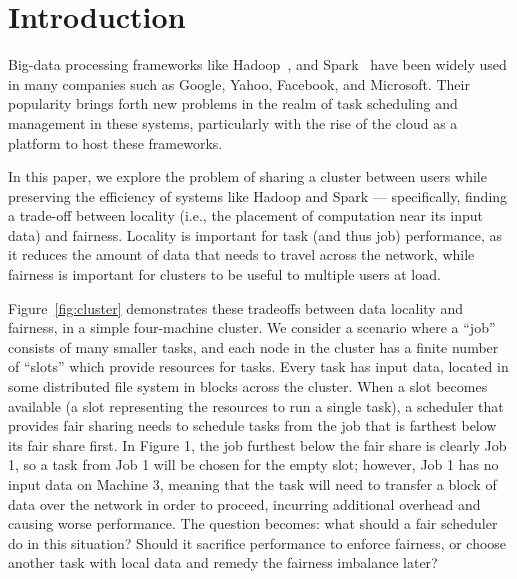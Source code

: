 \section{Introduction}\label{sec:intro}
Big-data processing frameworks like Hadoop~\cite{Shvachko:2010}, and Spark~\cite{Zaharia2012} have been widely 
used in many companies such as Google, Yahoo, Facebook, and Microsoft. Their popularity 
brings forth new problems in the realm of task scheduling and management in these systems,
particularly with the rise of the cloud as a platform to host these frameworks.

In this paper, we explore the problem of sharing a cluster between users while preserving 
the efficiency of systems like Hadoop and Spark --- specifically, finding a trade-off 
between locality (i.e., the placement of computation near its input data) and fairness. 
Locality is important for task (and thus job) performance, as it reduces the amount of data 
that needs to travel across the network, while fairness is important for clusters to be 
useful to multiple users at load. 

Figure~\ref{fig:cluster}  demonstrates these tradeoffs between data locality and fairness,
in a simple four-machine cluster. We consider a
scenario where a ``job'' consists of many smaller tasks, and each node in the cluster 
has a finite number of ``slots'' which provide resources for tasks. Every task has input data,
located in some distributed file system in blocks across the cluster. When a slot
becomes available (a slot representing the resources to run a single task),
a scheduler that provides fair sharing needs to schedule tasks from the job 
that is farthest below its fair share first. In Figure 1, the job furthest below
the fair share is clearly Job 1, so a task from Job 1 will be chosen for the empty slot; however,
Job 1 has no input data on Machine 3, meaning that the task will need to transfer a block
of data over the network in order to proceed, incurring additional overhead and causing
worse performance. The question becomes: what should a fair scheduler do
in this situation? Should it sacrifice performance to enforce fairness, or choose another task
with local data and remedy the fairness imbalance later? 

